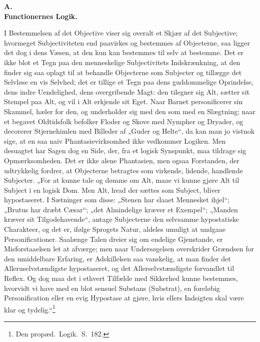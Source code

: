 \documentclass[12pt]{book}
\newcommand{\opage}[1]{\marginnote{\footnotesize\textit{[#1]}}}
\begin{document}
\begin{center}
{\bfseries A.}\\[2pt]
{\large\bfseries Functionernes Logik.}
\end{center}

I Bestemmelsen af det Objective viser sig overalt et Skjær af det Subjective; hvormeget Subjectiviteten
end paavirkes og bestemmes af Objecterne, saa ligger det dog i dens Væsen, at den kun kan bestemmes til
selv at bestemme. Det er ikke blot et Tegn paa den menneskelige Subjectivitets Indskrænkning, at den
finder sig saa oplagt til at behandle Objecterne som Subjecter og tillægge det Selvløse en vis Selvhed;
det er tillige et Tegn paa dens guddommelige Oprindelse, dens indre
\opage{275} Uendelighed, dens overgribende Magt: den tilegner sig Alt, sætter sit Stempel paa Alt, og vil i Alt
erkjende sit Eget. Naar Barnet personificerer sin Skammel, hæler for den, og underholder sig med den
som med en Slægtning; naar et begavet Oldtidsfolk befolker Floder og Skove med Nympher og Dryader, og
decorerer Stjernehimlen med Billeder af „Guder og Helte“, da kan man jo vistnok sige, at en saa naiv
Phantasievirksomhed ikke vedkommer Logiken. Men desuagtet har Sagen dog en Side, der, fra et logisk
Synspunkt, maa tildrage sig Opmærksomheden. Det er ikke alene Phantasien, men ogsaa Forstanden, der
udtrykkelig fordrer, at Objecterne betragtes som virkende, lidende, handlende Subjecter. „For at kunne
tale og dømme om Alt, maae vi kunne gjøre Alt til Subject i en logisk Dom. Men Alt, hvad der sættes som
Subject, bliver hypostaseret. I Sætninger som disse: „Stenen har slaaet Mennesket ihjel“; „Brutus har
dræbt Cæsar“; „det Almindelige kræver et Exempel“; „Manden kræver sit Tilgodehavende“, antage
Subjecterne den selvsamme hypostatiske Charakteer, og det er, ifølge Sprogets Natur, aldeles umuligt at
undgaae Personificationer. Saalænge Talen dreier sig om endelige Gjenstande, er Misforstaaelsen let at
afværge; men naar Undersøgelsen overskrider Grændsen for den umiddelbare Erfaring, er Adskillelsen saa
vanskelig, at man finder det Alleruselvstændigste hypostaseret, og det Allerselvstændigste forvandlet
til Reflex. Og dog maa det i ethvert Tilfælde med Sikkerhed kunne bestemmes, hvorvidt vi have med en
blot sensuel Substans (Substrat), en foreløbig Personification eller en evig Hypostase at gjøre, hvis
ellers Indsigten skal være klar og tydelig.“\footnote{Den propæd.\ Logik.\ S.~182.}
\end{document}
